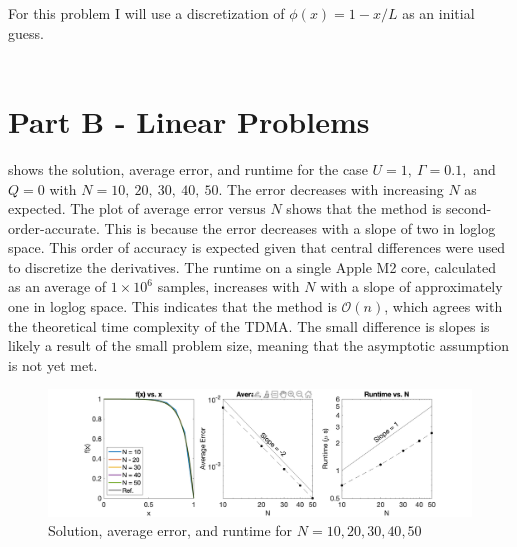 \documentclass[reqno, 12pt]{article}
\begin{document}
    For this problem I will use a discretization of $\phi(x) = 1 - x/L$ as an initial guess. \\~\

    \section*{Part B - Linear Problems}
     shows the solution, average error, and runtime for the case $U = 1,\ \Gamma = 0.1,$ and $Q = 0$ with $N = 10,\ 20,\ 30,\ 40,\ 50.$
    The error decreases with increasing $N$ as expected.
    The plot of average error versus $N$ shows that the method is second-order-accurate.
    This is because the error decreases with a slope of two in loglog space.
    This order of accuracy is expected given that central differences were used to discretize the derivatives.
    The runtime on a single Apple M2 core, calculated as an average of $1\times 10^6$ samples, increases with $N$ with a slope of approximately one in loglog space.
    This indicates that the method is $\mathcal{O}(n)$, which agrees with the theoretical time complexity of the TDMA.
    The small difference is slopes is likely a result of the small problem size, meaning that the asymptotic assumption is not yet met.
    \begin{figure}[h]
        \centering
        \includegraphics[width=\textwidth]{partA.png}
        \caption{Solution, average error, and runtime for $N = 10, 20, 30, 40, 50$}
        \label{fig:B}
    \end{figure}
\end{document}
